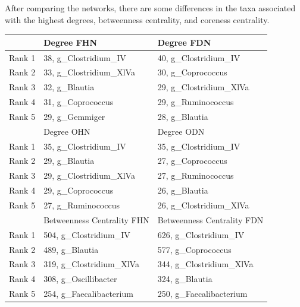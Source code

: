 After comparing the networks, there are some differences in the taxa associated with the highest degrees, betweenness centrality, and coreness centrality.
\begin{table}[!hbtp]
\centering
\begin{tabular}{rll}
  \toprule
 & Degree FHN & Degree FDN \\ 
  \midrule
Rank 1 & 38,  g\_Clostridium\_IV & 40,  g\_Clostridium\_IV \\ 
  Rank 2 & 33,  g\_Clostridium\_XlVa & 30,  g\_Coprococcus \\ 
  Rank 3 & 32,  g\_Blautia & 29,  g\_Clostridium\_XlVa \\ 
  Rank 4 & 31,  g\_Coprococcus & 29,  g\_Ruminococcus \\ 
  Rank 5 & 29,  g\_Gemmiger & 28,  g\_Blautia \\ 
  \midrule

 & Degree OHN & Degree ODN \\ 
  \midrule
Rank 1 & 35,  g\_Clostridium\_IV & 35,  g\_Clostridium\_IV \\ 
  Rank 2 & 29,  g\_Blautia & 27,  g\_Coprococcus \\ 
  Rank 3 & 29,  g\_Clostridium\_XlVa & 27,  g\_Ruminococcus \\ 
  Rank 4 & 29,  g\_Coprococcus & 26,  g\_Blautia \\ 
  Rank 5 & 27,  g\_Ruminococcus & 26,  g\_Clostridium\_XlVa \\ 
\bottomrule \toprule
 & Betweenness Centrality FHN & Betweenness Centrality FDN \\ 
  \midrule
Rank 1 & 504,  g\_Clostridium\_IV & 626,  g\_Clostridium\_IV \\ 
  Rank 2 & 489,  g\_Blautia & 577,  g\_Coprococcus \\ 
  Rank 3 & 319,  g\_Clostridium\_XlVa & 344,  g\_Clostridium\_XlVa \\ 
  Rank 4 & 308,  g\_Oscillibacter & 324,  g\_Blautia \\ 
  Rank 5 & 254,  g\_Faecalibacterium & 250,  g\_Faecalibacterium \\ 
  \midrule
  

\end{tabular}
\end{table}
